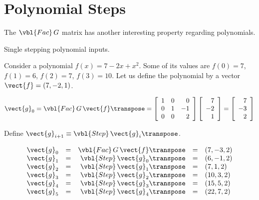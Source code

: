\section{Polynomial Steps}

The $\vbl{Fac}\,G$ matrix has another interesting property regarding polynomials.

\begin{example}
 \label{ex:firstpoly}
 Single stepping polynomial inputs.
\end{example}

Consider a polynomial $f(x) = 7 - 2x + x^2$.
Some of its values are $f(0)=7$, $f(1)=6$, $f(2)=7$, $f(3)=10$.
Let us define the polynomial by a vector $\vect{f} = (7, -2, 1)$.

\[
 \vect{g}_0 =
 \vbl{Fac}\,G\,\vect{f} \transpose =
 \left[\begin{array}{rrr}
   1 & 0 &  0 \\
   0 & 1 & -1 \\
   0 & 0 &  2 \\
 \end{array}\right]
 \left[\begin{array}{r}
   7 \\ -2 \\ 1 \\
 \end{array}\right]
 =
 \left[\begin{array}{r}
   7 \\ -3 \\ 2 \\
 \end{array}\right]
\]

Define $\vect{g}_{i+1} \equiv \vbl{Step}\,\vect{g}_i \transpose$.

\[\begin{array}{rcrcl}
  \vect{g}_0 & = & \vbl{Fac}\,G\,\vect{f} \transpose & = & ( 7, -3, 2) \\
  \vect{g}_1 & = & \vbl{Step}\,\vect{g}_0 \transpose & = & ( 6, -1, 2) \\
  \vect{g}_2 & = & \vbl{Step}\,\vect{g}_1 \transpose & = & ( 7,  1, 2) \\
  \vect{g}_3 & = & \vbl{Step}\,\vect{g}_2 \transpose & = & (10,  3, 2) \\
  \vect{g}_4 & = & \vbl{Step}\,\vect{g}_3 \transpose & = & (15,  5, 2) \\
  \vect{g}_5 & = & \vbl{Step}\,\vect{g}_4 \transpose & = & (22,  7, 2) \\
\end{array}\]

